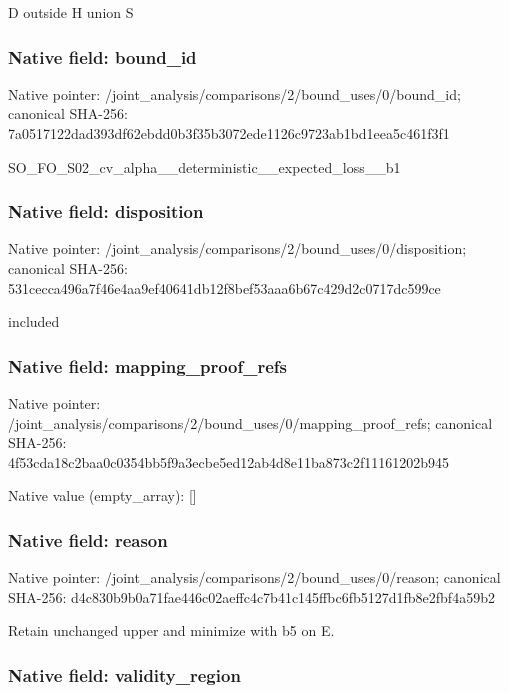 \documentclass[10pt,a4paper]{article}
\begin{document}
D outside H union S


\subsubsection{Native field: bound\_id}


Native pointer: /joint\_analysis/comparis\allowbreak{}ons/2/bound\_uses/0/bound\allowbreak{}\_id; canonical SHA-256: 7a0517122dad393df62ebdd0\allowbreak{}b3f35b3072ede1126c9723ab\allowbreak{}1bd1eea5c461f3f1


SO\_FO\_S02\_cv\_alpha\_\_dete\allowbreak{}rministic\_\_expected\_loss\allowbreak{}\_\_b1


\subsubsection{Native field: disposition}


Native pointer: /joint\_analysis/comparis\allowbreak{}ons/2/bound\_uses/0/dispo\allowbreak{}sition; canonical SHA-256: 531cecca496a7f46e4aa9ef4\allowbreak{}0641db12f8bef53aaa6b67c4\allowbreak{}29d2c0717dc599ce


included


\subsubsection{Native field: mapping\_proof\_refs}


Native pointer: /joint\_analysis/comparis\allowbreak{}ons/2/bound\_uses/0/mappi\allowbreak{}ng\_proof\_refs; canonical SHA-256: 4f53cda18c2baa0c0354bb5f\allowbreak{}9a3ecbe5ed12ab4d8e11ba87\allowbreak{}3c2f11161202b945



Native value (empty\_array): []



\subsubsection{Native field: reason}


Native pointer: /joint\_analysis/comparis\allowbreak{}ons/2/bound\_uses/0/reaso\allowbreak{}n; canonical SHA-256: d4c830b9b0a71fae446c02ae\allowbreak{}ffc4c7b41c145ffbc6fb5127\allowbreak{}d1fb8e2fbf4a59b2


Retain unchanged upper and minimize with b5 on E.


\subsubsection{Native field: validity\_region}
\end{document}
